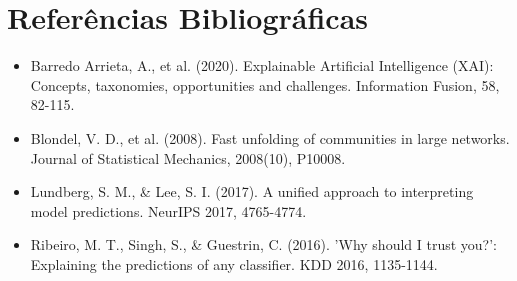 \documentclass[10pt,a4paper,journal]{article}
\begin{document}
\section{Referências Bibliográficas}
\begin{itemize}
\item Barredo Arrieta, A., et al. (2020). Explainable Artificial Intelligence (XAI): Concepts, taxonomies, opportunities and challenges. Information Fusion, 58, 82-115.
\end{itemize}
\begin{itemize}
\item Blondel, V. D., et al. (2008). Fast unfolding of communities in large networks. Journal of Statistical Mechanics, 2008(10), P10008.
\end{itemize}
\begin{itemize}
\item Lundberg, S. M., \& Lee, S. I. (2017). A unified approach to interpreting model predictions. NeurIPS 2017, 4765-4774.
\end{itemize}
\begin{itemize}
\item Ribeiro, M. T., Singh, S., \& Guestrin, C. (2016). 'Why should I trust you?': Explaining the predictions of any classifier. KDD 2016, 1135-1144.
\end{itemize}
\end{document}
